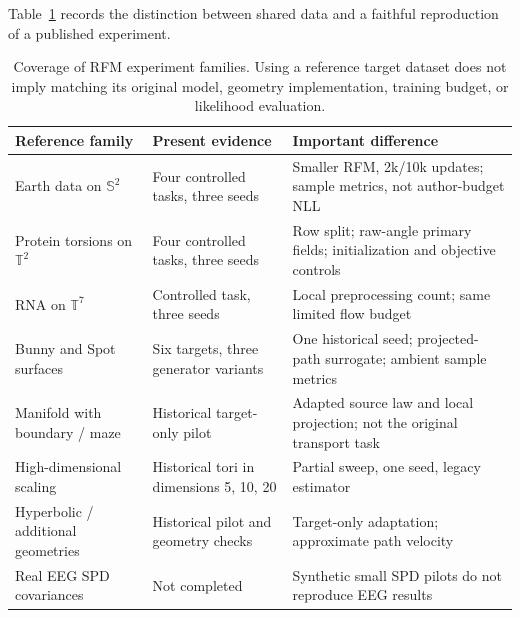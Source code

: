Table~\ref{tab:benchmark-scope} records the distinction between shared data and a faithful reproduction of a published experiment.
\begin{table}[t]
\caption{Coverage of RFM experiment families. Using a reference target dataset does not imply matching its original model, geometry implementation, training budget, or likelihood evaluation.}
\label{tab:benchmark-scope}
\centering\small
\begin{tabular}{@{}p{}p{}p{}@{}}
\toprule
Reference family & Present evidence & Important difference \\
\midrule
Earth data on $\mathbb S^2$ & Four controlled tasks, three seeds & Smaller RFM, 2k/10k updates; sample metrics, not author-budget NLL \\
Protein torsions on $\mathbb T^2$ & Four controlled tasks, three seeds & Row split; raw-angle primary fields; initialization and objective controls \\
RNA on $\mathbb T^7$ & Controlled task, three seeds & Local preprocessing count; same limited flow budget \\
Bunny and Spot surfaces & Six targets, three generator variants & One historical seed; projected-path surrogate; ambient sample metrics \\
Manifold with boundary / maze & Historical target-only pilot & Adapted source law and local projection; not the original transport task \\
High-dimensional scaling & Historical tori in dimensions 5, 10, 20 & Partial sweep, one seed, legacy estimator \\
Hyperbolic / additional geometries & Historical pilot and geometry checks & Target-only adaptation; approximate path velocity \\
Real EEG SPD covariances & Not completed & Synthetic small SPD pilots do not reproduce EEG results \\
\bottomrule
\end{tabular}
\end{table}

